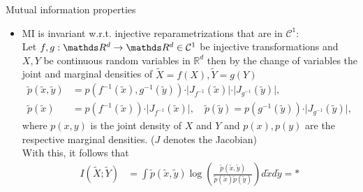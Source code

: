 \documentclass[11pt,compress,t,notes=noshow, xcolor=table]{beamer}
\begin{document}
    

\begin{vbframe} {Mutual information properties}
\begin{itemize}
    \item MI is invariant w.r.t. injective reparametrizations that are in $\mathcal{C}^1:$\\
    \medskip
    Let $f, g: \R^d\rightarrow\R^d \in \mathcal{C}^1$ be injective transformations and $X, Y$ be continuous random variables in $\mathbb{R}^d$ then by the change of variables the joint and marginal densities of  $\tilde{X} = f(X), \tilde{Y} = g(Y)$
    \begin{align*}
        \tilde{p}(\tilde{x}, \tilde{y}) &= p(f^{-1}(\tilde{x}), g^{-1}(\tilde{y}))\cdot\vert J_{f^{-1}}(\tilde{x})\vert\cdot\vert J_{g^{-1}}(\tilde{y})\vert, \\
        \tilde{p}(\tilde{x}) &= p(f^{-1}(\tilde{x}))\cdot\vert J_{f^{-1}}(\tilde{x})\vert,\quad \tilde{p}(\tilde{y}) = p(g^{-1}(\tilde{y}))\cdot\vert J_{g^{-1}}(\tilde{y})\vert, 
    \end{align*}
    where $p(x, y)$ is the joint density of $X$ and $Y$ and $p(x), p(y)$ are the respective marginal densities. ($J$ denotes the Jacobian) \\
    \medskip
    With this, it follows that 
    \begin{align*}
      I(\tilde{X}; \tilde{Y}) &= \int \tilde{p}(\tilde{x}, \tilde{y}) \log\left(\frac{\tilde{p}(\tilde{x}, \tilde{y})}{\tilde{p}(\tilde{x})\tilde{p}(\tilde{y})}\right)d\tilde{x}d\tilde{y}  = *
    \end{align*}
\end{itemize}
\end{vbframe}
\end{document}
